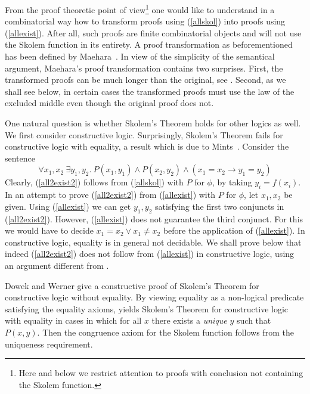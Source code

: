 \documentclass{fundam}
\begin{document}
From the proof theoretic point of view\footnote{%
Here and below we restrict attention to
proofs with conclusion not containing the Skolem function.} 
one would like to understand
in a combinatorial way how to transform proofs
using (\ref{allskol}) into proofs using  (\ref{allexist}).  
After all, such proofs are finite
combinatorial objects and will not use the Skolem function in its entirety.
A proof transformation as beforementioned
has been defined by Maehara~\cite{Maehara}. 
In view of the simplicity of the semantical argument, 
Maehara's proof transformation contains two surprises.
First, the transformed proofs can be much longer than the original, 
see \cite{BaazLeitsch94}.
Second, as we shall see below, in certain cases the transformed proofs must use
the law of the excluded middle even though the original proof does not.

One natural question is whether Skolem's Theorem holds for other logics as well.
We first consider constructive logic. Surprisingly, Skolem's Theorem fails
for constructive logic with equality, a result which is due to Mints~\cite{Mints}.
Consider the sentence
\begin{equation}\label{all2exist2}
\forall x_1,x_2~\exists y_1,y_2. ~P(x_1,y_1) \land P(x_2,y_2) \land (x_1 = x_2 \to y_1 = y_2)
\end{equation}
Clearly,  (\ref{all2exist2}) follows from (\ref{allskol}) 
with $P$ for $\phi$, by taking $y_i = f(x_i)$.
In an attempt to prove (\ref{all2exist2}) from (\ref{allexist}) 
with $P$ for $\phi$, let $x_1,x_2$ be given.
Using (\ref{allexist}) we can get $y_1,y_2$ satisfying the first two conjuncts
in (\ref{all2exist2}). However, (\ref{allexist}) does not guarantee the third conjunct.
For this we would have to decide $ x_1 = x_2 \lor x_1 \neq x_2$ before the
application of (\ref{allexist}). In constructive logic, equality is in general not decidable.
We shall prove below that indeed (\ref{all2exist2}) does not follow from  (\ref{allexist})
in constructive logic, using an argument different from \cite{Mints}.

Dowek and Werner \cite{DW} give a constructive proof of 
Skolem's Theorem for constructive logic without equality.
By viewing equality as a non-logical predicate satisfying the equality
axioms, \cite{DW} yields Skolem's Theorem for constructive logic with equality
in cases in which for all $x$ there exists a \emph{unique} $y$  such that $P(x,y)$.
Then the congruence axiom for the Skolem function follows from 
the uniqueness requirement.
\end{document}
